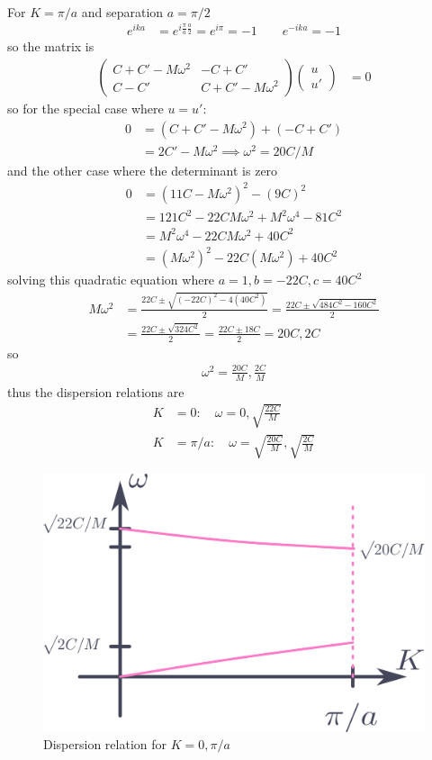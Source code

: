 \documentclass[../main.tex]{subfiles}
\begin{document}
\paragraph*{} For $K = \pi/a$ and separation $a = \pi/2$ 
\begin{align*}
    e^{ika} &= e^{i\frac{\pi}{a} \frac{a}{2}} = e^{i\pi} = -1 \qquad e^{-ika} = -1 
\end{align*}
so the matrix is
\begin{align*}
    \begin{pmatrix}
        C + C' - M\omega^2 & -C + C' \\
        C - C' & C + C' - M\omega^2
    \end{pmatrix}
    \begin{pmatrix}
        u \\ u'
    \end{pmatrix}
    &= 0
\end{align*}
so for the special case where $u = u'$:
\begin{align*}
    0 &= (C + C' - M\omega^2) + (-C + C') \\
    &= 2C' - M\omega^2 \implies \omega^2 = 20C/M
\end{align*}
and the other case where the determinant is zero
\begin{align*}
    0 &= (11C - M\omega^2)^2 - (9C)^2 \\
    &= 121C^2 - 22CM\omega^2 + M^2\omega^4 - 81C^2 \\
    &= M^2\omega^4 - 22CM\omega^2 + 40C^2 \\
    &= (M\omega^2)^2 - 22C(M\omega^2) + 40C^2
\end{align*}
solving this quadratic equation where $a = 1, b = -22C, c = 40C^2$
\begin{align*}
    M\omega^2 &= \frac{22C \pm \sqrt{(-22C)^2 - 4(40C^2)}}{2} = \frac{22C \pm \sqrt{484C^2 - 160C^2}}{2} \\
    &= \frac{22C \pm \sqrt{324C^2}}{2} = \frac{22C \pm 18C}{2} = 20C, 2C
\end{align*}
so
\begin{align*}
    \omega^2 = \frac{20C}{M}, \frac{2C}{M}
\end{align*}
thus the dispersion relations are
\begin{align*}
    K&=0 : \quad \omega = 0, \sqrt{\frac{22C}{M}} \\
    K&=\pi/a : \quad \omega = \sqrt{\frac{20C}{M}}, \sqrt{\frac{2C}{M}}
\end{align*}
\begin{figure}[ht]
    \centering
    \includegraphics[width=0.5\linewidth]{hw2a.png}
    \caption{Dispersion relation for $K = 0, \pi/a$}
\end{figure}
\newpage
\end{document}
